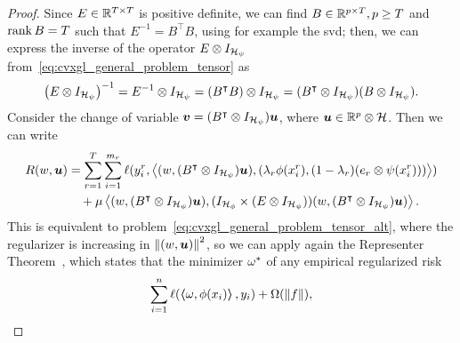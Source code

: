 \begin{proof}
    Since ${E} \in \mathbb{R}^{T \times T}$ is positive definite, we can find $B \in \mathbb{R}^{p \times T}, p \geq T$ and $\operatorname{rank}{B} = T$ such that $E^{-1} =
            {B^\intercal} {B}$, using for example the \acrfull{svd};
    then, we can express the inverse of the operator $E \otimes I_{\mathcal{H}_\psi}$ from~\eqref{eq:cvxgl_general_problem_tensor} as
    $$ \left(E \otimes I_{\mathcal{H}_\psi}\right)^{-1} = E^{-1} \otimes I_{\mathcal{H}_\psi} = (B^\intercal B) \otimes I_{\mathcal{H}_\psi} = (B^\intercal \otimes I_{\mathcal{H}_\psi}) (B \otimes I_{\mathcal{H}_\psi}).$$
    Consider the change of variable $\bm{v} = (B^\intercal \otimes I_{\mathcal{H}_\psi}) \bm{u}$, where $\bm{u} \in \mathbb{R}^p \otimes \mathcal{H}$. Then we can write
    \begin{equation}
        \nonumber
        \begin{aligned}
            R(w, \bm{u}) & = \sum_{r=1}^{T} \sum_{i=1}^{m_r} \ell(y_i^r, \bm{\left\langle} (w, (B^\intercal \otimes I_{\mathcal{H}_\psi}) \bm{u}),  (\lambda_r \phi(x_i^r), (1 - \lambda_r) (e_r \otimes \psi(x_i^r))) \bm{\right\rangle}) \\
                         & \quad + \mu \bm{\left\langle} (w, (B^\intercal \otimes I_{\mathcal{H}_\psi}) \bm{u}), (I_{\mathcal{H}_\phi} \times (E \otimes I_{\mathcal{H}_\psi})) (w, (B^\intercal \otimes I_{\mathcal{H}_\psi}) \bm{u})  \bm{\right\rangle}                    .
        \end{aligned}
    \end{equation}
    This is equivalent to problem~\eqref{eq:cvxgl_general_problem_tensor_alt}, where the regularizer is increasing in $\left\lVert(w, \bm{u})\right\rVert^2$, so we can apply again the Representer Theorem~\citep{ScholkopfHS01}, which states that the minimizer ${\omega}^*$ of any empirical regularized risk
    \begin{equation}
        \nonumber
        \sum_{i=1}^\nsamples \ell(\dotp{\omega}{\phi(x_i)}, y_i) + \Omega(\norm{f}),

\end{equation}
\end{proof}
